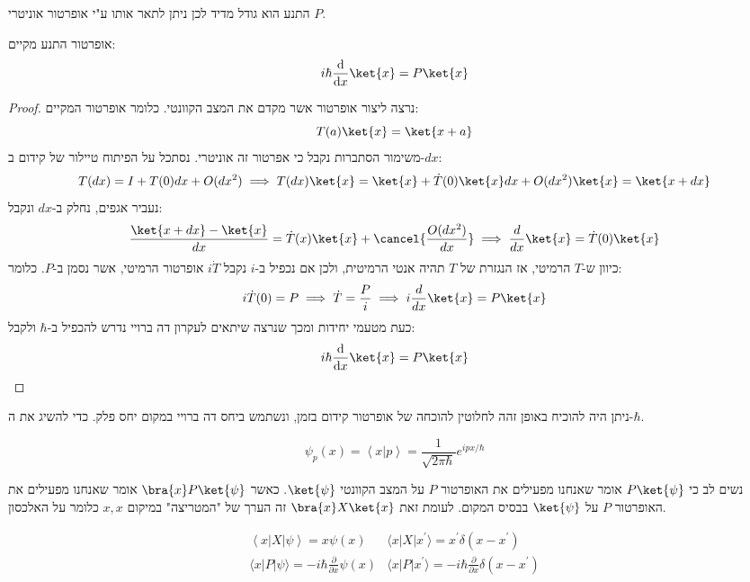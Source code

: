 \documentclass{tstextbook}
\begin{document}
\begin{definition}
התנע הוא גודל מדיד לכן ניתן לתאר אותו ע"י אופרטור אוניטרי \(P\).

\end{definition}
\begin{proposition}
אופרטור התנע מקיים:
$$i\hbar \frac{\mathrm{d} }{\mathrm{d} x} \ket{x} = P\ket{x} $$

\end{proposition}
\begin{proof}
נרצה ליצור אופרטור אשר מקדם את המצב הקוונטי. כלומר אופרטור המקיים:
$$T(a)\ket{x} = \ket{x+a} $$
משימור הסתברות נקבל כי אפרטור זה אוניטרי. נסתכל על הפיתוח טיילור של קידום ב-\(dx\):
$$T(dx)=I+T(0)dx+O(dx^2)\implies T(dx)\ket{x} =\ket{x} +\dot{T}(0)\ket{x} dx+O(dx^2)\ket{x} =\ket{x+dx} $$
נעביר אגפים, נחלק ב-\(dx\) ונקבל:
$$\frac{\ket{x+dx}-\ket{x} }{dx}=\dot{T}(x)\ket{x} +\cancel{ \frac{O(dx^2)}{dx} }\implies  \frac{d}{dx}\ket{x} =\dot{T}(0)\ket{x}  $$
כיוון ש-\(T\) הרמיטי, אז הנגזרת של \(T\) תהיה אנטי הרמיטית, ולכן אם נכפיל ב-\(i\) נקבל \(i\dot{T}\) אופרטור הרמיטי, אשר נסמן ב-\(P\). כלומר:
$$i\dot{T}(0)=P\implies \dot{T}=\frac{P}{i }\implies i\frac{d}{dx}\ket{x}  =  P \ket{x}  $$
כעת מטעמי יחידות ומכך שנרצה שיתאים לעקרון דה ברויי נדרש להכפיל ב-\(\hbar\) ולקבל:
$$i\hbar \frac{\mathrm{d} }{\mathrm{d} x} \ket{x} = P\ket{x} $$

\end{proof}
\begin{remark}
ניתן היה להוכיח באופן זהה לחלוטין להוכחה של אופרטור קידום בזמן, ונשתמש ביחס דה ברויי במקום יחס פלק. כדי להשיג את ה-\(\hbar\).

\end{remark}
\begin{proposition}
$$\psi_{p}\left(x\right)=\left\langle x|p\right\rangle={\frac{1}{\sqrt{2\pi\hbar}}}e^{i p x/\hbar}$$

\end{proposition}
\begin{symbolize}
נשים לב כי \(P\ket{\psi}\) אומר שאנחנו מפעילים את האופרטור \(P\) על המצב הקוונטי \(\ket{\psi}\). כאשר \(\bra{x}P\ket{\psi}\) אומר שאנחנו מפעילים את האופרטור \(P\) על \(\ket{\psi}\) בבסיס המקום. לעומת זאת \(\bra{x}X\ket{x}\) זה הערך של "המטריצה" במיקום \(x,x\) כלומר על האלכסון.

\end{symbolize}
\begin{proposition}
$$\begin{gather}\left\langle  x|X|\psi \right\rangle=x\psi(x)  & \langle x|X|x^{\prime}\rangle=x^{\prime}\delta(x-x^{\prime}) \\\langle x|P|\psi\rangle=-i\hbar\frac{\partial}{\partial x}\psi(x) & \langle x|P|x^{\prime}\rangle=-i\hbar{\frac{\partial}{\partial x}}\delta(x-x^{\prime})
\end{gather}$$

\end{proposition}
\end{document}
